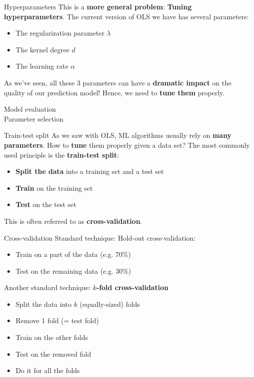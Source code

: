 \documentclass{beamer}
\newcommand{\1}[1]{\mathbbm{1}\left[#1\right]}
\begin{document}
\begin{frame}{Hyperparameters}
This is a \textbf{more general problem}: \textbf{Tuning hyperparameters}. The current version of OLS we have has several parameters:
\begin{itemize}
	\item The regularization parameter $\lambda$
	\item The kernel degree $d$
	\item The learning rate $\alpha$
\end{itemize}
\vfill
\pause
As we've seen, all these 3 parameters can have a \textbf{dramatic impact} on the quality of our prediction model! Hence, we need to \textbf{tune them} properly.
\end{frame}

\begin{frame}
	\center
	\huge{Model evaluation\\ Parameter selection}
\end{frame}

\begin{frame}{Train-test split}
As we saw with OLS, ML algorithms usually rely on \textbf{many parameters}. How to \textbf{tune} them properly given a data set?
\vfill
\pause
The most commonly used principle is the \textbf{train-test split}:
\begin{itemize}
	\item \textbf{Split the data} into a training set and a test set
	\item \textbf{Train} on the training set
	\item \textbf{Test} on the test set
\end{itemize}
\vfill
\pause
This is often referred to as \textbf{cross-validation}.
\end{frame}

\begin{frame}{Cross-validation}
Standard technique: Hold-out cross-validation:
\begin{itemize}
	\item Train on a part of the data (e.g. 70\%)
	\item Test on the remaining data (e.g. 30\%)
\end{itemize}
\pause
\vfill
Another standard technique: \textbf{$k$-fold cross-validation}
\begin{itemize}
	\item Split the data into $k$ (equally-sized) folds
	\item Remove 1 fold (= test fold)
	\item Train on the other folds
	\item Test on the removed fold
	\item Do it for all the folds
\end{itemize}
\end{frame}
\end{document}
